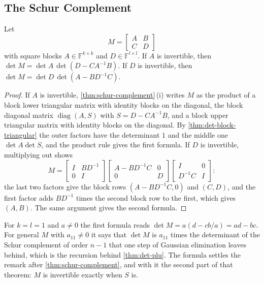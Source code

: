 \subsection{The Schur Complement}

\begin{theorem}
\label{thm:det-schur}
Let
\[
M=\begin{bmatrix}A&B\\C&D\end{bmatrix}
\]
with square blocks $A\in\mathbb F^{k\times k}$ and $D\in\mathbb F^{l\times l}$. If $A$ is invertible, then $\det M=\det A\,\det(D-CA^{-1}B)$. If $D$ is invertible, then $\det M=\det D\,\det(A-BD^{-1}C)$.
\end{theorem}

\begin{proof}
If $A$ is invertible, \cref{thm:schur-complement}\,(i) writes $M$ as the product of a block lower triangular matrix with identity blocks on the diagonal, the block diagonal matrix $\operatorname{diag}(A,S)$ with $S=D-CA^{-1}B$, and a block upper triangular matrix with identity blocks on the diagonal. By \cref{thm:det-block-triangular} the outer factors have the determinant $1$ and the middle one $\det A\det S$, and the product rule gives the first formula. If $D$ is invertible, multiplying out shows
\[
M=\begin{bmatrix}I&BD^{-1}\\0&I\end{bmatrix}\begin{bmatrix}A-BD^{-1}C&0\\0&D\end{bmatrix}\begin{bmatrix}I&0\\D^{-1}C&I\end{bmatrix}:
\]
the last two factors give the block rows $(A-BD^{-1}C,0)$ and $(C,D)$, and the first factor adds $BD^{-1}$ times the second block row to the first, which gives $(A,B)$. The same argument gives the second formula.
\end{proof}

For $k=l=1$ and $a\ne0$ the first formula reads $\det M=a(d-cb/a)=ad-bc$. For general $M$ with $a_{11}\ne0$ it says that $\det M$ is $a_{11}$ times the determinant of the Schur complement of order $n-1$ that one step of Gaussian elimination leaves behind, which is the recursion behind \cref{thm:det-plu}. The formula settles the remark after \cref{thm:schur-complement}, and with it the second part of that theorem: $M$ is invertible exactly when $S$ is.

